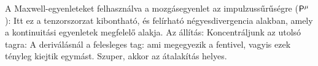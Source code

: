    A Maxwell-egyenleteket felhasználva a mozgásegyenlet az impulzussűrűségre ($\mathsf{P}^{\mu}$):
   Itt ez a tenzorszorzat kibontható, és felírható négyesdivergencia alakban, amely a kontinuitási egyenletek megfelelő alakja. Az állítás:
   Koncentráljunk az utolsó tagra:
   A deriválásnál a felesleges tag:
   ami megegyezik a fentivel, vagyis ezek tényleg kiejtik egymást. Szuper, akkor az átalakítás helyes. 
   
